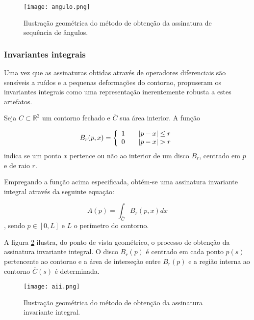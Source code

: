 \begin{figure}[h!]
  \caption{\label{fig:angulo} Ilustração geométrica do método de obtenção da assinatura de sequência de ângulos.}
  \centering
  \texttt{[image: angulo.png]}
\end{figure}

\subsubsection{Invariantes integrais}

Uma vez que as assinaturas obtidas através de operadores diferenciais são sensíveis a ruídos e a pequenas deformações do contorno,  propuseram os invariantes integrais como uma representação inerentemente robusta a estes artefatos.

Seja $C \subset \mathbb{R}^2$ um contorno fechado e $\overline{C}$ sua área interior.
A função 

\begin{equation}
 B_r(p,x) = \left\{
  \begin{array}{l l}
    1 & \quad |p-x|\leq r\\
    0 & \quad |p-x|> r
  \end{array} \right.
\end{equation} indica se um ponto $x$ pertence ou não ao interior de um disco $B_r$,  centrado em $p$ e de raio $r$.

Empregando a função acima especificada, obtém-se uma assinatura invariante integral através da seguinte equação: 

\begin{equation}
A(p) = \int_{\overline{C}}{B_r(p,x)dx}
\end{equation}, sendo $p \in [0,L]$ e $L$ o perímetro do contorno.

A figura \ref{fig:Aii} ilustra, do ponto de vista geométrico, o processo de obtenção da assinatura invariante integral. O disco $B_r(p)$ é centrado em cada ponto $p(s)$ pertencente ao contorno e a área de interseção entre $B_r(p)$ e a região interna ao contorno $\overline{C}(s)$ é determinada.

\begin{figure}[h!]
  \caption{\label{fig:Aii} Ilustração geométrica do método de obtenção da assinatura invariante integral.}
  \centering
  \texttt{[image: aii.png]}
\end{figure}

